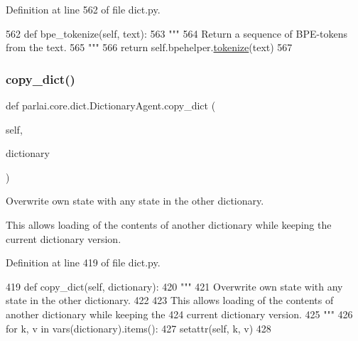 Definition at line 562 of file dict.\+py.


\begin{DoxyCode}
562     \textcolor{keyword}{def }bpe\_tokenize(self, text):
563         \textcolor{stringliteral}{"""}
564 \textcolor{stringliteral}{        Return a sequence of BPE-tokens from the text.}
565 \textcolor{stringliteral}{        """}
566         \textcolor{keywordflow}{return} self.bpehelper.\hyperlink{namespaceparlai_1_1agents_1_1tfidf__retriever_1_1build__tfidf_a1fdb457e98eb4e4c26047e229686a616}{tokenize}(text)
567 
\end{DoxyCode}
\mbox{\label{classparlai_1_1core_1_1dict_1_1DictionaryAgent_a84faa359351d8b3edfb333e3b5f5ed71}} 
\subsubsection{\texorpdfstring{copy\+\_\+dict()}{copy\_dict()}}
{\footnotesize\ttfamily def parlai.\+core.\+dict.\+Dictionary\+Agent.\+copy\+\_\+dict (\begin{DoxyParamCaption}\item[{}]{self,  }\item[{}]{dictionary }\end{DoxyParamCaption})}

\begin{DoxyVerb}Overwrite own state with any state in the other dictionary.

This allows loading of the contents of another dictionary while keeping the
current dictionary version.
\end{DoxyVerb}
 

Definition at line 419 of file dict.\+py.


\begin{DoxyCode}
419     \textcolor{keyword}{def }copy\_dict(self, dictionary):
420         \textcolor{stringliteral}{"""}
421 \textcolor{stringliteral}{        Overwrite own state with any state in the other dictionary.}
422 \textcolor{stringliteral}{}
423 \textcolor{stringliteral}{        This allows loading of the contents of another dictionary while keeping the}
424 \textcolor{stringliteral}{        current dictionary version.}
425 \textcolor{stringliteral}{        """}
426         \textcolor{keywordflow}{for} k, v \textcolor{keywordflow}{in} vars(dictionary).items():
427             setattr(self, k, v)
428 
\end{DoxyCode}
\mbox{\label{classparlai_1_1core_1_1dict_1_1DictionaryAgent_a72cfec62b2d5117326f514edfe848a1e}} 

